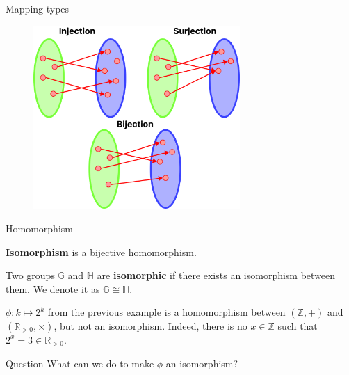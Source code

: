 \documentclass{beamer}
\begin{document}
  \begin{frame}{Mapping types}
    \begin{figure}
      \includegraphics[width=0.7\textwidth]{images/lecture_1/mapping.pdf}
      \label{fig:mappings}
    \end{figure}
  \end{frame}

  \begin{frame}{Homomorphism}
    \begin{definition}
      \textbf{Isomorphism} is a bijective homomorphism.
    \end{definition}
    \pause

    \begin{definition}
      Two groups $\mathbb{G}$ and $\mathbb{H}$ are \textbf{isomorphic} if there exists an isomorphism between them. We denote it as $\mathbb{G} \cong \mathbb{H}$.
    \end{definition}
    \pause

    \begin{example}
     $\phi: k \mapsto 2^k$ from the previous example is a homomorphism between $(\mathbb{Z},+)$ and $(\mathbb{R}_{>0},\times)$, but not an isomorphism. Indeed, there is no $x \in \mathbb{Z}$ such that $2^x = 3 \in \mathbb{R}_{>0}$.
    \end{example}
    \pause

    \begin{alertblock}{Question}
      What can we do to make $\phi$ an isomorphism?
     \end{alertblock}
  \end{frame}
\end{document}
